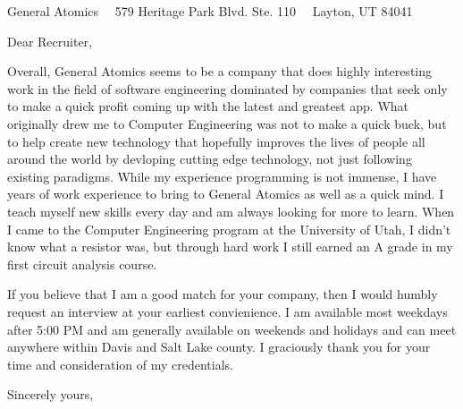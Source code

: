 \documentclass{scrlttr2}
\renewcommand{\\}{\ {\large\textperiodcentered}\ }
\begin{document}

\begin{letter}{ %
General Atomics\\
579 Heritage Park Blvd. Ste. 110\\
Layton, UT 84041
}


\opening{Dear Recruiter,} %


Overall, General Atomics seems to be a company that does highly interesting work in the field of software engineering dominated by companies that seek only to make a quick profit coming up with the latest and greatest app.  What originally drew me to Computer Engineering was not to make a quick buck, but to help create new technology that hopefully improves the lives of people all around the world by devloping cutting edge technology, not just following existing paradigms.  While my experience programming is not immense, I have years of work experience to bring to General Atomics as well as a quick mind.  I teach myself new skills every day and am always looking for more to learn.  When I came to the Computer Engineering program at the University of Utah, I didn't know what a resistor was, but through hard work I still earned an A grade in my first circuit analysis course. \\


If you believe that I am a good match for your company, then I would humbly request an interview at your earliest convienience.  I am available most weekdays after 5:00 PM and am generally available on weekends and holidays and can meet anywhere within Davis and Salt Lake county.  I graciously thank you for your time and consideration of my credentials. \\

Sincerely yours, \\ \\ \\


\end{letter}
\end{document}
